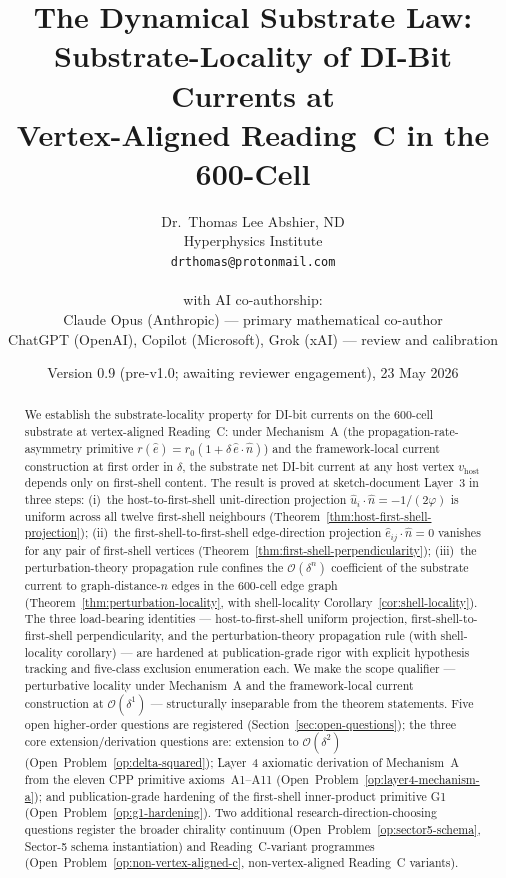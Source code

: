 \documentclass[11pt,letterpaper]{article}
\title{The Dynamical Substrate Law:\\
Substrate-Locality of DI-Bit Currents at\\
Vertex-Aligned Reading~C in the 600-Cell}
\author{Dr.~Thomas Lee Abshier, ND\\
\small Hyperphysics Institute\\
\small \texttt{drthomas@protonmail.com}\\
\\
\small with AI co-authorship:\\
\small Claude Opus (Anthropic) --- primary mathematical co-author\\
\small ChatGPT (OpenAI), Copilot (Microsoft), Grok (xAI) --- review and calibration
}
\date{Version 0.9 (pre-v1.0; awaiting reviewer engagement), 23 May 2026}
\newcommand{\phig}{\varphi}
\newcommand{\nhat}{\hat{n}}
\newcommand{\vhost}{v_{\text{host}}}
\newcommand{\bigO}[1]{\mathcal{O}(#1)}
\begin{document}
\maketitle

\begin{abstract}
We establish the substrate-locality property for DI-bit currents on the 600-cell substrate at vertex-aligned Reading~C: under Mechanism~A (the propagation-rate-asymmetry primitive $r(\hat{e}) = r_0(1 + \delta\,\hat{e}\cdot\nhat)$) and the framework-local current construction at first order in $\delta$, the substrate net DI-bit current at any host vertex $\vhost$ depends only on first-shell content. The result is proved at sketch-document Layer~3 in three steps: (i)~the host-to-first-shell unit-direction projection $\hat{u}_i \cdot \nhat = -1/(2\phig)$ is uniform across all twelve first-shell neighbours (Theorem~\ref{thm:host-first-shell-projection}); (ii)~the first-shell-to-first-shell edge-direction projection $\hat{e}_{ij} \cdot \nhat = 0$ vanishes for any pair of first-shell vertices (Theorem~\ref{thm:first-shell-perpendicularity}); (iii)~the perturbation-theory propagation rule confines the $\bigO{\delta^n}$ coefficient of the substrate current to graph-distance-$n$ edges in the 600-cell edge graph (Theorem~\ref{thm:perturbation-locality}, with shell-locality Corollary~\ref{cor:shell-locality}).
The three load-bearing identities --- host-to-first-shell uniform projection, first-shell-to-first-shell perpendicularity, and the perturbation-theory propagation rule (with shell-locality corollary) --- are hardened at publication-grade rigor with explicit hypothesis tracking and five-class exclusion enumeration each.
We make the scope qualifier --- perturbative locality under Mechanism~A and the framework-local current construction at $\bigO{\delta^1}$ --- structurally inseparable from the theorem statements.
Five open higher-order questions are registered (Section~\ref{sec:open-questions}); the three core extension/derivation questions are: extension to $\bigO{\delta^2}$ (Open~Problem~\ref{op:delta-squared}); Layer~4 axiomatic derivation of Mechanism~A from the eleven CPP primitive axioms~A1--A11 (Open~Problem~\ref{op:layer4-mechanism-a}); and publication-grade hardening of the first-shell inner-product primitive G1 (Open~Problem~\ref{op:g1-hardening}). Two additional research-direction-choosing questions register the broader chirality continuum (Open~Problem~\ref{op:sector5-schema}, Sector-5 schema instantiation) and Reading~C-variant programmes (Open~Problem~\ref{op:non-vertex-aligned-c}, non-vertex-aligned Reading~C variants).

\end{abstract}
\end{document}

